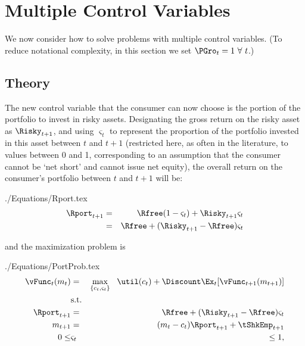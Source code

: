 \documentclass[titlepage]{\econtex}
\begin{document}
\hypertarget{Multiple-Control-Variables}{}
\section{Multiple Control Variables}

We now consider how to solve problems with multiple control variables.
(To reduce notational complexity, in this section we set $\PGro_{t}=1~\forall~t$.)

\subsection{Theory}
The new control variable that the consumer can now choose
is the portion of the portfolio to invest in risky assets.
Designating the gross return on the risky asset
as $\Risky_{t+1}$, and using $\varsigma_{t}$ to represent the
proportion of the portfolio invested in this asset between $t$ and $t+1$
(restricted here, as often in the literature, to values between 0 and
1, corresponding to an assumption that the consumer cannot be `net
short' and cannot issue net equity), the overall return on
the consumer's portfolio between $t$ and $t+1$ will be:
\begin{verbatimwrite}{./Equations/Rport.tex}
  \begin{eqnarray}
    \Rport_{t+1} & = & \Rfree(1-\varsigma_{t}) + \Risky_{t+1}\varsigma_{t} \label{eq:return1}
    \\              & = & \Rfree + (\Risky_{t+1}-\Rfree) \varsigma_{t} \label{eq:return2}
  \end{eqnarray}
\end{verbatimwrite}

and the maximization problem is
\begin{verbatimwrite}{./Equations/PortProb.tex}
  \begin{eqnarray*}
    {\vFunc}_{t}({m}_{t}) & = & \max_{\{{c}_{t},\varsigma_{t}\}}   ~~ \util({c}_{t}) +  \Discount
                                \Ex_{t}[{\vFunc}_{t+1}({m}_{t+1})]
    \\      & \text{s.t.} & \nonumber
    \\      \Rport_{t+1} & = & \Rfree + (\Risky_{t+1}-\Rfree) \varsigma_{t}
    \\      {m}_{t+1} & = & ({m}_{t}-{c}_{t})\Rport_{t+1} + \tShkEmp_{t+1}
    \\  0       \leq & \varsigma_{t} & \leq 1, \label{eq:noshorts}
  \end{eqnarray*}
\end{verbatimwrite}
\end{document}
